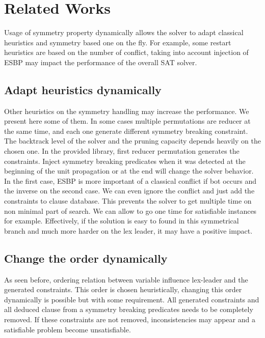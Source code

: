\section{Related Works}

Usage of symmetry property dynamically allows the solver to adapt classical heuristics and symmetry based one on the fly.
For example, some restart heuristics are based on the number of conflict, taking into account injection of ESBP may impact
the performance of the overall SAT solver. 

\subsection{Adapt heuristics dynamically}

Other heuristics on the symmetry handling may increase the performance. We present here some of them.
In some cases multiple permutations are reducer at the same time, and each one generate different symmetry breaking constraint.
The backtrack level of the solver and the pruning capacity depends heavily on the chosen one. In the provided library, first reducer permutation generates the constraints. Inject symmetry breaking predicates when it was detected at the beginning of the 
unit propagation or at the end will change the solver behavior. In the first case, ESBP is more important of a classical conflict
if bot occurs and the inverse on the second case. We can even ignore the conflict and just add the constraints to clause database.
This prevents the solver to get multiple time on non minimal part of search. We can allow to go one time for satisfiable instances 
for example. Effectively, if the solution is easy to found in this symmetrical branch and much more harder on the lex leader, it may
have a positive impact.

\subsection{Change the order dynamically}

As seen before, ordering relation between variable influence lex-leader and the generated constraints. This order is chosen 
heuristically, changing this order dynamically is possible but with some requirement. All generated constraints and all deduced 
clause from a symmetry breaking predicates needs to be completely removed. If these constraints are not removed, inconsistencies 
may appear and a satisfiable problem become unsatisfiable.









